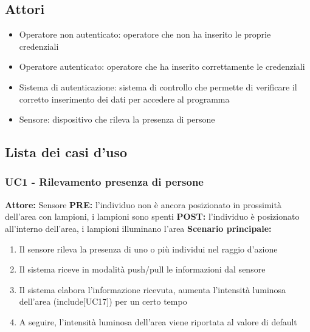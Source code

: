 \documentclass[a4paper, 12pt]{article}
\begin{document}
\subsection{Attori}
\begin{itemize}
    \item Operatore non autenticato: operatore che non ha inserito le proprie credenziali
    \item Operatore autenticato: operatore che ha inserito correttamente le credenziali
    \item Sistema di autenticazione: sistema di controllo che permette di verificare il corretto inserimento dei dati per accedere al programma
    \item Sensore: dispositivo che rileva la presenza di persone
\end{itemize}

\subsection{Lista dei casi d'uso}
\subsubsection{UC1 - Rilevamento presenza di persone}
\textbf{Attore:} Sensore\newline
\textbf{PRE:} l'individuo non è ancora posizionato in prossimità dell'area con lampioni, i lampioni sono spenti\newline
\textbf{POST:} l'individuo è posizionato all'interno dell'area, i lampioni illuminano l'area\newline
\textbf{Scenario principale:}
\begin{enumerate}
    \item Il sensore rileva la presenza di uno o più individui nel raggio d'azione
    \item Il sistema riceve in modalità push/pull le informazioni dal sensore
    \item Il sistema elabora l'informazione ricevuta, aumenta l'intensità luminosa dell'area (include[UC17]) per un certo tempo
    \item A seguire, l'intensità luminosa dell'area viene riportata al valore di default
\end{enumerate}
\end{document}
